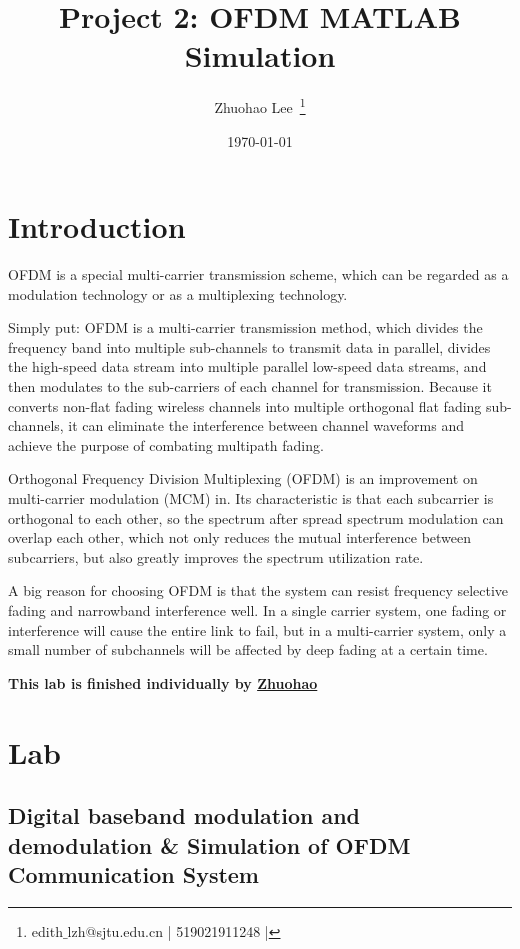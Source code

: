 \documentclass{article}
\title{\textbf{Project 2: OFDM MATLAB Simulation}} %
\author{Zhuohao Lee~\textsuperscript{\Letter }\thanks{edith$\_$lzh@sjtu.edu.cn | 519021911248 | \faGithub{}{\underline{\href{https://github.com/edithlzh/VLSI-course-note}{~Project Repo}}}}} %
\date{\today} %
\begin{document}
\maketitle %

\tableofcontents

\newpage

\section{Introduction}
OFDM is a special multi-carrier transmission scheme, which can be regarded as a modulation technology or as a multiplexing technology.

Simply put: OFDM is a multi-carrier transmission method, which divides the frequency band into multiple sub-channels to transmit data in parallel, divides the high-speed data stream into multiple parallel low-speed data streams, and then modulates to the sub-carriers of each channel for transmission. Because it converts non-flat fading wireless channels into multiple orthogonal flat fading sub-channels, it can eliminate the interference between channel waveforms and achieve the purpose of combating multipath fading.

Orthogonal Frequency Division Multiplexing (OFDM) is an improvement on multi-carrier modulation (MCM) in. Its characteristic is that each subcarrier is orthogonal to each other, so the spectrum after spread spectrum modulation can overlap each other, which not only reduces the mutual interference between subcarriers, but also greatly improves the spectrum utilization rate.

A big reason for choosing OFDM is that the system can resist frequency selective fading and narrowband interference well. In a single carrier system, one fading or interference will cause the entire link to fail, but in a multi-carrier system, only a small number of subchannels will be affected by deep fading at a certain time.

\textbf{This lab is finished individually by \underline{Zhuohao}}


\section{Lab}
\subsection{Digital baseband modulation and demodulation \& Simulation of OFDM Communication System}
\end{document}
